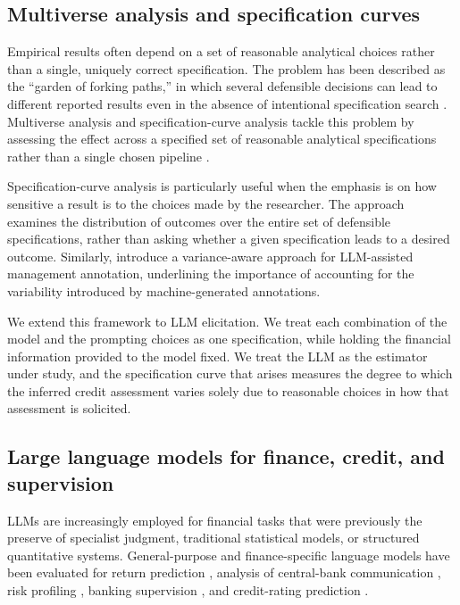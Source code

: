 \documentclass[a4paper,fleqn]{cas-sc}
\begin{document}
\subsection{Multiverse analysis and specification curves}
Empirical results often depend on a set of reasonable analytical choices rather than a single, uniquely
correct specification. The problem has been described as the ``garden of forking paths,'' in which
several defensible decisions can lead to different reported results even in the absence of intentional
specification search \citep{gelman2013garden,simmons2011false}. Multiverse analysis and
specification-curve analysis tackle this problem by assessing the effect across a specified set of
reasonable analytical specifications rather than a single chosen pipeline
\citep{steegen2016multiverse,simonsohn2020specification}.

Specification-curve analysis is particularly useful when the emphasis is on how sensitive a result is to
the choices made by the researcher. The approach examines the distribution of outcomes over the entire
set of defensible specifications, rather than asking whether a given specification leads to a desired
outcome. Similarly, \citet{camuffo2026variance} introduce a variance-aware approach for
LLM-assisted management annotation, underlining the importance of accounting for the variability
introduced by machine-generated annotations.

We extend this framework to LLM elicitation. We treat each combination of the model and the prompting
choices as one specification, while holding the financial information provided to the model fixed. We
treat the LLM as the estimator under study, and the specification curve that arises
measures the degree to which the inferred credit assessment varies solely due to reasonable choices in
how that assessment is solicited.

\subsection{Large language models for finance, credit, and supervision}
LLMs are increasingly employed for financial tasks that were previously the preserve of specialist
judgment, traditional statistical models, or structured quantitative systems. General-purpose
\citep{brown2020gpt3,ouyang2022instruct,achiam2023gpt4} and finance-specific
\citep{wu2023bloomberggpt,xie2023pixiu} language models have been evaluated for
return prediction \citep{lopezlira2023chatgpt}, analysis of central-bank
communication \citep{hansen2024fedspeak}, risk profiling \citep{hens2025risk}, banking supervision
\citep{garciallorente2026banking}, and credit-rating prediction \citep{drinkall2025forecasting}.
\end{document}

